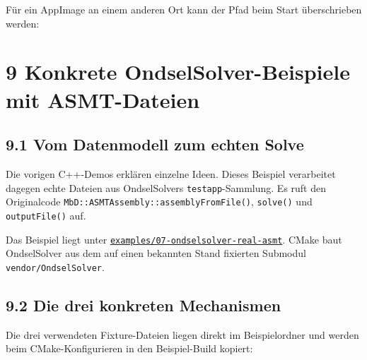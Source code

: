 \documentclass[
  12pt
]{book}
\newenvironment{Shaded}{}{}
\newcommand{\ExtensionTok}[1]{#1}
\newcommand{\OperatorTok}[1]{\textcolor[rgb]{0.40,0.40,0.40}{#1}}
\newcommand{\StringTok}[1]{\textcolor[rgb]{0.25,0.44,0.63}{#1}}
\newcommand{\VariableTok}[1]{\textcolor[rgb]{0.10,0.09,0.49}{#1}}
\begin{document}
Für ein AppImage an einem anderen Ort kann der Pfad beim Start
überschrieben werden:

\begin{Shaded}
\end{Shaded}

\hypertarget{kap-asmt-beispiele}{%
\chapter{\texorpdfstring{{9} Konkrete OndselSolver-Beispiele mit
ASMT-Dateien}{9 Konkrete OndselSolver-Beispiele mit ASMT-Dateien}}\label{kap-asmt-beispiele}}

\hypertarget{vom-datenmodell-zum-echten-solve}{%
\section{\texorpdfstring{{9.1} Vom Datenmodell zum echten
Solve}{9.1 Vom Datenmodell zum echten Solve}}\label{vom-datenmodell-zum-echten-solve}}

Die vorigen C++-Demos erklären einzelne Ideen. Dieses Beispiel
verarbeitet dagegen echte Dateien aus OndselSolvers
\texttt{testapp}-Sammlung. Es ruft den Originalcode
\texttt{MbD::ASMTAssembly::assemblyFromFile()}, \texttt{solve()} und
\texttt{outputFile()} auf.

Das Beispiel liegt unter
\href{./examples/07-ondselsolver-real-asmt/README.md}{\texttt{examples/07-ondselsolver-real-asmt}}.
CMake baut OndselSolver aus dem auf einen bekannten Stand fixierten
Submodul \texttt{vendor/OndselSolver}.

\hypertarget{die-drei-konkreten-mechanismen}{%
\section{\texorpdfstring{{9.2} Die drei konkreten
Mechanismen}{9.2 Die drei konkreten Mechanismen}}\label{die-drei-konkreten-mechanismen}}

Die drei verwendeten Fixture-Dateien liegen direkt im Beispielordner und
werden beim CMake-Konfigurieren in den Beispiel-Build kopiert:
\end{document}

